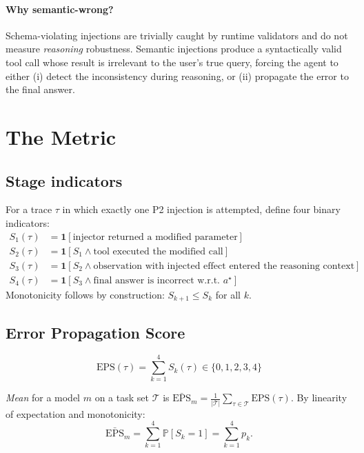 \documentclass[11pt]{article}
\newcommand{\eps}{\mathrm{EPS}}
\newcommand{\Pr}{\mathbb{P}}
\newcommand{\ind}{\mathbf{1}}
\begin{document}
\paragraph{Why semantic-wrong?} Schema-violating injections are trivially caught by runtime validators and do not measure \emph{reasoning} robustness. Semantic injections produce a syntactically valid tool call whose result is irrelevant to the user's true query, forcing the agent to either (i) detect the inconsistency during reasoning, or (ii) propagate the error to the final answer.

\section{The \eps{} Metric}
\label{sec:metric}

\subsection{Stage indicators}
For a trace $\tau$ in which exactly one P2 injection is attempted, define four binary indicators:
\begin{align}
S_1(\tau) &= \ind[\text{injector returned a modified parameter}] \label{eq:s1}\\
S_2(\tau) &= \ind[S_1 \wedge \text{tool executed the modified call}] \label{eq:s2}\\
S_3(\tau) &= \ind[S_2 \wedge \text{observation with injected effect entered the reasoning context}] \label{eq:s3}\\
S_4(\tau) &= \ind[S_3 \wedge \text{final answer is incorrect w.r.t. } a^\star] \label{eq:s4}
\end{align}
Monotonicity follows by construction: $S_{k+1} \leq S_k$ for all $k$.

\subsection{Error Propagation Score}
\begin{equation}
\eps(\tau) = \sum_{k=1}^{4} S_k(\tau) \in \{0, 1, 2, 3, 4\}
\end{equation}

\emph{Mean \eps{}} for a model $m$ on a task set $\mathcal{T}$ is $\bar{\eps}_m = \frac{1}{|\mathcal{T}|}\sum_{\tau \in \mathcal{T}} \eps(\tau)$. By linearity of expectation and monotonicity:
\begin{equation}
\bar{\eps}_m = \sum_{k=1}^{4} \Pr[S_k = 1] = \sum_{k=1}^{4} p_k.
\end{equation}
\end{document}

